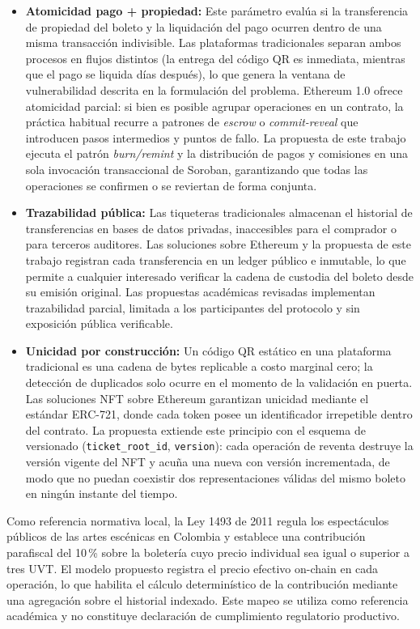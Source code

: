 \begin{itemize}
    \item \textbf{Atomicidad pago + propiedad:} Este parámetro evalúa si la transferencia de propiedad del
boleto y la liquidación 
    del pago ocurren dentro de una misma transacción indivisible. Las plataformas tradicionales separan ambos
procesos en flujos 
    distintos (la entrega del código QR es inmediata, mientras que el pago se liquida días después), lo que
genera la ventana de 
    vulnerabilidad descrita en la formulación del problema. Ethereum 1.0 ofrece atomicidad parcial: si bien
es posible agrupar 
    operaciones en un contrato, la práctica habitual recurre a patrones de \textit{escrow} o
\textit{commit-reveal} que introducen 
    pasos intermedios y puntos de fallo. La propuesta de este trabajo ejecuta el patrón \textit{burn/remint}
y la distribución 
    de pagos y comisiones en una sola invocación transaccional de Soroban, garantizando que todas las
operaciones se confirmen 
    o se reviertan de forma conjunta.

    \item \textbf{Trazabilidad pública:} Las tiqueteras tradicionales almacenan el historial de
transferencias en bases de datos 
    privadas, inaccesibles para el comprador o para terceros auditores. Las soluciones sobre Ethereum y la
propuesta de este 
    trabajo registran cada transferencia en un ledger público e inmutable, lo que permite a cualquier
interesado verificar la 
    cadena de custodia del boleto desde su emisión original. Las propuestas académicas revisadas implementan
trazabilidad parcial, 
    limitada a los participantes del protocolo y sin exposición pública verificable.

    \item \textbf{Unicidad por construcción:} Un código QR estático en una plataforma tradicional es una
cadena de bytes 
    replicable a costo marginal cero; la detección de duplicados solo ocurre en el momento de la validación
en puerta. Las 
    soluciones NFT sobre Ethereum garantizan unicidad mediante el estándar ERC-721, donde cada token posee un
identificador 
    irrepetible dentro del contrato. La propuesta extiende este principio con el esquema de versionado 
    (\texttt{ticket\_root\_id}, \texttt{version}): cada operación de reventa destruye la versión vigente del
NFT y acuña una 
    nueva con versión incrementada, de modo que no puedan coexistir dos representaciones válidas del mismo
boleto en ningún 
    instante del tiempo.
\end{itemize}

Como referencia normativa local, la Ley 1493 de 2011 regula los espectáculos públicos de las artes escénicas en Colombia y establece una contribución parafiscal del 10\,\% sobre la boletería cuyo precio individual sea igual o superior a tres UVT. El modelo propuesto registra el precio efectivo on-chain en cada operación, lo que habilita el cálculo determinístico de la contribución mediante una agregación sobre el historial indexado. Este mapeo se utiliza como referencia académica y no constituye declaración de cumplimiento regulatorio productivo.

